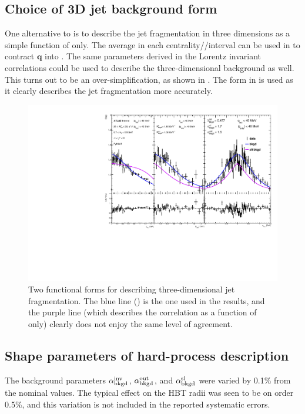 \subsection{Choice of 3D jet background form}

One alternative to  is to describe the jet fragmentation in three dimensions as a simple function of \qinv only.
The average \kt in each centrality/\kt/\kys interval can be used in  to contract $\mathbf{q}$ into \qinv.
The same parameters derived in the Lorentz invariant correlations could be used to describe the three-dimensional background as well.
This turns out to be an over-simplification, as shown in .
The form in  is used as it clearly describes the jet fragmentation more accurately.

\begin{figure}[t]
\begin{minipage}[t]{\textwidth}
\centering
\includegraphics[width=\linewidth]{can_Cqosl_pythia_altbkgd_cent7_e3_kt6_ys1.pdf}
\end{minipage}
\caption{Two functional forms for describing three-dimensional jet fragmentation. The blue line () is the one used in the results, and the purple line (which describes the correlation as a function of \qinv only) clearly does not enjoy the same level of agreement.}
\label{fig:pythia_qosl_alt_bkgd}
\end{figure}


\subsection{Shape parameters of hard-process description}
The background parameters $\alpha_{\mathrm{bkgd}}^\mathrm{inv}$, $\alpha_{\mathrm{bkgd}}^\mathrm{out}$, and $\alpha_{\mathrm{bkgd}}^\mathrm{sl}$ were varied by 0.1\% from the nominal values.
The typical effect on the HBT radii was seen to be on order 0.5\%, and this variation is not included in the reported systematic errors.

